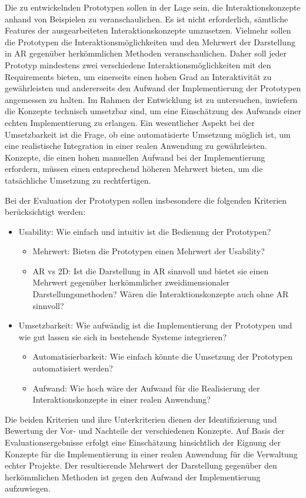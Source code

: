 Die zu entwickelnden Prototypen sollen in der Lage sein, die Interaktionskonzepte anhand von Beispielen zu veranschaulichen.
Es ist nicht erforderlich, sämtliche Features der ausgearbeiteten Interaktionskonzepte umzusetzen.
Vielmehr sollen die Prototypen die Interaktionsmöglichkeiten und den Mehrwert der Darstellung in AR gegenüber herkömmlichen Methoden veranschaulichen. \newline
Daher soll jeder Prototyp mindestens zwei verschiedene Interaktionsmöglichkeiten mit den Requirements bieten, um einerseits einen hohen Grad an Interaktivität zu gewährleisten und andererseits den Aufwand der Implementierung der Prototypen angemessen zu halten.
Im Rahmen der Entwicklung ist zu untersuchen, inwiefern die Konzepte technisch umsetzbar sind, um eine Einschätzung des Aufwands einer echten Implementierung zu erlangen.
Ein wesentlicher Aspekt bei der Umsetzbarkeit ist die Frage, ob eine automatisierte Umsetzung möglich ist, um eine realistische Integration in einer realen Anwendung zu gewährleisten.
Konzepte, die einen hohen manuellen Aufwand bei der Implementierung erfordern, müssen einen entsprechend höheren Mehrwert bieten, um die tatsächliche Umsetzung zu rechtfertigen. 

Bei der Evaluation der Prototypen sollen insbesondere die folgenden Kriterien berücksichtigt werden:

\begin{itemize}
    \item Usability: Wie einfach und intuitiv ist die Bedienung der Prototypen?
    \begin{itemize}
        \item Mehrwert: Bieten die Prototypen einen Mehrwert der Usability?
        \item AR vs 2D: Ist die Darstellung in AR sinnvoll und bietet sie einen Mehrwert gegenüber herkömmlicher zweidimensionaler Darstellungsmethoden? Wären die Interaktionskonzepte auch ohne AR sinnvoll?
    \end{itemize}
    \item Umsetzbarkeit: Wie aufwändig ist die Implementierung der Prototypen und wie gut lassen sie sich in bestehende Systeme integrieren?
    \begin{itemize}
        \item Automatisierbarkeit: Wie einfach könnte die Umsetzung der Prototypen automatisiert werden?
        \item Aufwand: Wie hoch wäre der Aufwand für die Realisierung der Interaktionskonzepte in einer realen Anwendung?
    \end{itemize}
\end{itemize}

Die beiden Kriterien und ihre Unterkriterien dienen der Identifizierung und Bewertung der Vor- und Nachteile der verschiedenen Konzepte.
Auf Basis der Evaluationsergebnisse erfolgt eine Einschätzung hinsichtlich der Eignung der Konzepte für die Implementierung in einer realen Anwendung für die Verwaltung echter Projekte.
Der resultierende Mehrwert der Darstellung gegenüber den herkömmlichen Methoden ist gegen den Aufwand der Implementierung aufzuwiegen.

